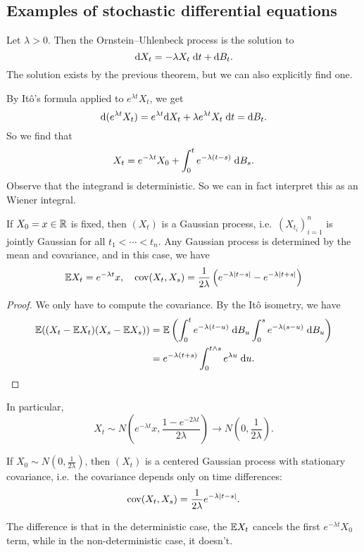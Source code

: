 \documentclass[a4paper]{article}
\begin{document}
\subsection{Examples of stochastic differential equations}
\begin{eg}
  Let $\lambda > 0$. Then the Ornstein--Uhlenbeck process is the solution to
  \[
    \mathrm{d} X_t = - \lambda X_t \;\mathrm{d} t + \mathrm{d} B_t.
  \]
  The solution exists by the previous theorem, but we can also explicitly find one.

  By It\^o's formula applied to $e^{\lambda t} X_t$, we get
  \[
    \mathrm{d} (e^{\lambda t} X_t) = e^{\lambda t} \mathrm{d} X_t + \lambda e^{\lambda t} X_t \;\mathrm{d} t = \mathrm{d} B_t.
  \]
  So we find that
  \[
    X_t = e^{-\lambda t} X_0 + \int_0^t e^{-\lambda (t - s)}\;\mathrm{d} B_s.
  \]
  Observe that the integrand is deterministic. So we can in fact interpret this as an Wiener integral.
\end{eg}

\begin{fact}
  If $X_0 = x \in \mathbb{R}$ is fixed, then $(X_t)$ is a Gaussian process, i.e.\ $(X_{t_i})_{i = 1}^n $ is jointly Gaussian for all $t_1 < \cdots < t_n$. Any Gaussian process is determined by the mean and covariance, and in this case, we have
  \[
    \mathbb{E} X_t = e^{-\lambda t} x,\quad \operatorname{cov}(X_t, X_s) = \frac{1}{2\lambda} \left(e^{-\lambda |t - s|} - e^{-\lambda |t + s|}\right)
  \]
\end{fact}

\begin{proof}
  We only have to compute the covariance. By the It\^o isometry, we have
  \begin{align*}
    \mathbb{E} ((X_t - \mathbb{E} X_t) (X_s - \mathbb{E} X_s)) &= \mathbb{E} \left(\int_0^t e^{-\lambda (t - u)}\;\mathrm{d} B_u \int_0^s e^{-\lambda (s - u)}\;\mathrm{d} B_u\right)\\
    &= e^{-\lambda (t + s)} \int_0^{t \wedge s} e^{\lambda u}\;\mathrm{d} u.\qedhere
  \end{align*}
\end{proof}
In particular,
\[
  X_t \sim N\left(e^{-\lambda t}x, \frac{1 - e^{-2\lambda t}}{2 \lambda}\right) \to N\left(0, \frac{1}{2\lambda}\right).
\]
\begin{fact}
  If $X_0 \sim N(0, \frac{1}{2\lambda})$, then $(X_t)$ is a centered Gaussian process with stationary covariance, i.e.\ the covariance depends only on time differences:
  \[
    \operatorname{cov}(X_t, X_s) = \frac{1}{2\lambda} e^{-\lambda |t - s|}.
  \]
\end{fact}
The difference is that in the deterministic case, the $\mathbb{E} X_t$ cancels the first $e^{-\lambda t} X_0$ term, while in the non-deterministic case, it doesn't.
\end{document}
